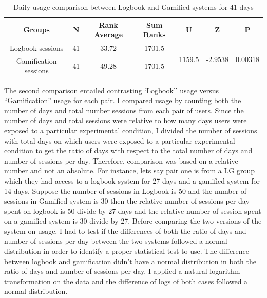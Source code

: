 \begin{table}[h!]
  \begin{center}
    \caption{Daily usage comparison between Logbook and Gamified systems for 41 days}
    \label{table:usagedays}
	\begin{tabular}{|c|c|c|c|c|c|c|}
		\hline
		Groups&N&Rank Average&Sum Ranks&U&Z&P\\
		\hline
   		Logbook sessions&41&33.72&1701.5&\multirow{2}{*}{1159.5}&\multirow{2}{*}{-2.9538}& \multirow{2}{*}{0.00318}\\\cline{1-4} 
   		 		    Gamification sessions&41&49.28& 1701.5&&&\\
\hline
	\end{tabular}
  \end{center}
\end{table}
\newline 
The second comparison entailed contrasting `Logbook'' usage versus ``Gamification'' usage for each pair. I compared usage by counting both the number of days and total number sessions from each pair of users. Since the number of days and total sessions were relative to how many days users were exposed to a particular experimental condition, I divided the number of sessions with total days on which users were exposed to a particular experimental condition to get the ratio of days with respect to the total number of days and number of sessions per day. Therefore, comparison was based on a relative number and not an absolute. For instance, lets say pair one is from a LG group which they had access to a logbook system for 27 days and a gamified system for 14 days. Suppose the number of sessions in Logbook is 50 and the number of sessions in Gamified system is 30 then the relative number of sessions per day spent on logbook is 50 divide by 27 days and the relative number of session spent on  a gamified system is 30 divide by 27. Before comparing the two versions of the system on usage, I had to test if the differences of both the ratio of days and number of sessions per day between the two systems followed a normal distribution in order to identify a proper statistical test to use. The difference between logbook and gamification didn't have a normal distribution in both the ratio of days and number of sessions per day. I applied a natural logarithm transformation on the data and the difference of logs of both cases followed a normal distribution. 
\newline 

